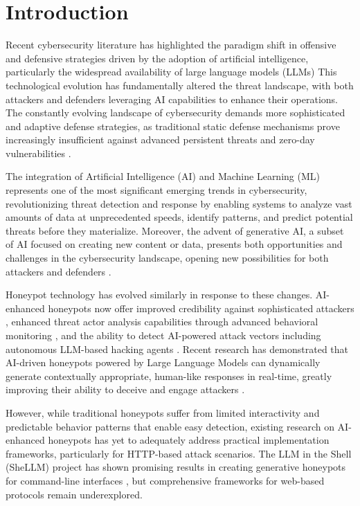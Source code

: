 \chapter{Introduction}
Recent cybersecurity literature has highlighted the paradigm shift in offensive and defensive strategies driven by the adoption of artificial intelligence, particularly the widespread availability of large language models (LLMs) This technological evolution has fundamentally altered the threat landscape, with both attackers and defenders leveraging AI capabilities to enhance their operations. The constantly evolving landscape of cybersecurity demands more sophisticated and adaptive defense strategies, as traditional static defense mechanisms prove increasingly insufficient against advanced persistent threats and zero-day vulnerabilities \cite{gizzarelli2024}.

The integration of Artificial Intelligence (AI) and Machine Learning (ML) represents one of the most significant emerging trends in cybersecurity, revolutionizing threat detection and response by enabling systems to analyze vast amounts of data at unprecedented speeds, identify patterns, and predict potential threats before they materialize. Moreover, the advent of generative AI, a subset of AI focused on creating new content or data, presents both opportunities and challenges in the cybersecurity landscape, opening new possibilities for both attackers and defenders \cite{gizzarelli2024}.

Honeypot technology has evolved similarly in response to these changes. AI-enhanced honeypots now offer improved credibility against sophisticated attackers \cite{christli2024}, enhanced threat actor analysis capabilities through advanced behavioral monitoring \cite{Otal2024}, and the ability to detect AI-powered attack vectors including autonomous LLM-based hacking agents \cite{reworr2024}. Recent research has demonstrated that AI-driven honeypots powered by Large Language Models can dynamically generate contextually appropriate, human-like responses in real-time, greatly improving their ability to deceive and engage attackers \cite{christli2024}.

However, while traditional honeypots suffer from limited interactivity and predictable behavior patterns that enable easy detection, existing research on AI-enhanced honeypots has yet to adequately address practical implementation frameworks, particularly for HTTP-based attack scenarios. The LLM in the Shell (SheLLM) project has shown promising results in creating generative honeypots for command-line interfaces \cite{sladic2023}, but comprehensive frameworks for web-based protocols remain underexplored.

